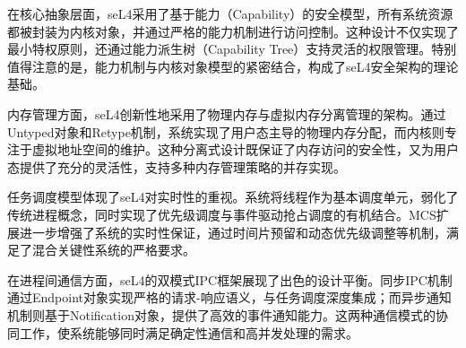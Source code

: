 在核心抽象层面，seL4采用了基于能力（Capability）的安全模型，所有系统资源都被封装为内核对象，并通过严格的能力机制进行访问控制。这种设计不仅实现了最小特权原则，还通过能力派生树（Capability Tree）支持灵活的权限管理。特别值得注意的是，能力机制与内核对象模型的紧密结合，构成了seL4安全架构的理论基础。

内存管理方面，seL4创新性地采用了物理内存与虚拟内存分离管理的架构。通过Untyped对象和Retype机制，系统实现了用户态主导的物理内存分配，而内核则专注于虚拟地址空间的维护。这种分离式设计既保证了内存访问的安全性，又为用户态提供了充分的灵活性，支持多种内存管理策略的并存实现。

任务调度模型体现了seL4对实时性的重视。系统将线程作为基本调度单元，弱化了传统进程概念，同时实现了优先级调度与事件驱动抢占调度的有机结合。MCS扩展进一步增强了系统的实时性保证，通过时间片预留和动态优先级调整等机制，满足了混合关键性系统的严格要求。

在进程间通信方面，seL4的双模式IPC框架展现了出色的设计平衡。同步IPC机制通过Endpoint对象实现严格的请求-响应语义，与任务调度深度集成；而异步通知机制则基于Notification对象，提供了高效的事件通知能力。这两种通信模式的协同工作，使系统能够同时满足确定性通信和高并发处理的需求。


